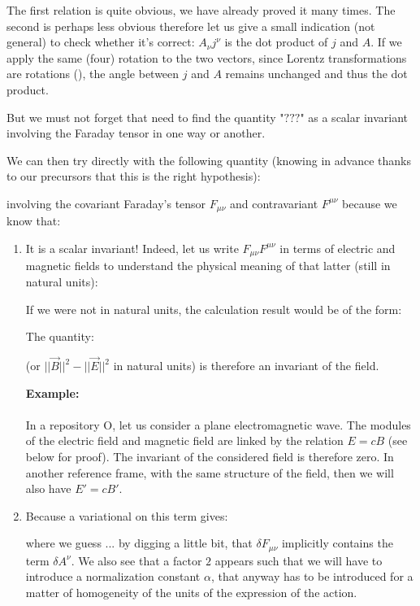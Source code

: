 	The first relation is quite obvious, we have already proved it many times. The second is perhaps less obvious therefore let us give a small indication (not general) to check whether it's correct: $A_\nu j^\nu$ is the dot product of $j$ and $A$. If we apply the same (four) rotation to the two vectors, since Lorentz transformations are rotations (), the angle between $j$ and $A$ remains unchanged and thus the dot product.

	But we must not forget that need to find the quantity "$???$" as a scalar invariant involving the Faraday tensor in one way or another.

	We can then try directly with the following quantity (knowing in advance thanks to our precursors that this is the right hypothesis):
	
	involving the covariant Faraday's tensor $F_{\mu\nu}$ and contravariant $F^{\mu \nu}$ because we know that:
	\begin{enumerate}
		\item It is a scalar invariant! Indeed, let us write $F_{\mu\nu}F^{\mu\nu}$ in terms of electric and magnetic fields to understand the physical meaning of that latter (still in natural units)\label{electromagnetic tensor invariant proof}:
		
		\begin{tcolorbox}[title=Remark,colframe=black,arc=10pt]
		If we were not in natural units, the calculation result would be of the form:
		
		The quantity:
		
		(or $||\vec{B}||^2-||\vec{E}||^2$ in natural units) is therefore an invariant of the field.
		\end{tcolorbox}
		\begin{tcolorbox}[colframe=black,colback=white,sharp corners]
		\textbf{{\Large {}}Example:}\\\\
		In a repository O, let us consider a plane electromagnetic wave. The modules of the electric field and magnetic field are linked by the relation $E=cB$ (see below for proof). The invariant of the considered field is therefore zero. In another reference frame, with the same structure of the field, then we will also have $E'=cB'$.
		\end{tcolorbox}
		
		\item Because a variational on this term gives:
		
		where we guess ... by digging a little bit, that $\delta F_{\mu\nu}$ implicitly contains the term $\delta A^\nu$. We also see that a factor $2$ appears such that we will have to introduce a normalization constant $\alpha$,  that anyway has to be introduced for a matter of homogeneity of the units of the expression of the action.
	\end{enumerate}
	
